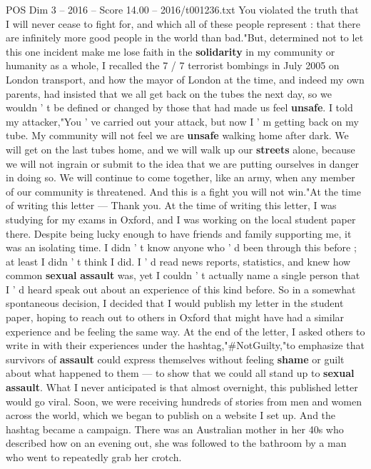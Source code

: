 \begin{textsample}{POS Dim 3 – 2016 – Score 14.00 – 2016/t001236.txt}
You violated the truth that I will never cease to fight for, and which all of these people represent : that there are infinitely more good people in the world than bad."But, determined not to let this one incident make me lose faith in the \textbf{solidarity} in my community or humanity as a whole, I recalled the 7 / 7 terrorist bombings in July 2005 on London transport, and how the mayor of London at the time, and indeed my own parents, had insisted that we all get back on the tubes the next day, so we wouldn ' t be defined or changed by those that had made us feel \textbf{unsafe}.
I told my attacker,"You ' ve carried out your attack, but now I ' m getting back on my tube.
My community will not feel we are \textbf{unsafe} walking home after dark.
We will get on the last tubes home, and we will walk up our \textbf{streets} alone, because we will not ingrain or submit to the idea that we are putting ourselves in danger in doing so.
We will continue to come together, like an army, when any member of our community is threatened.
And this is a fight you will not win."At the time of writing this letter — Thank you.
At the time of writing this letter, I was studying for my exams in Oxford, and I was working on the local student paper there.
Despite being lucky enough to have friends and family supporting me, it was an isolating time.
I didn ' t know anyone who ' d been through this before ; at least I didn ' t think I did.
I ' d read news reports, statistics, and knew how common \textbf{sexual} \textbf{assault} was, yet I couldn ' t actually name a single person that I ' d heard speak out about an experience of this kind before.
So in a somewhat spontaneous decision, I decided that I would publish my letter in the student paper, hoping to reach out to others in Oxford that might have had a similar experience and be feeling the same way.
At the end of the letter, I asked others to write in with their experiences under the hashtag,"\#NotGuilty,"to emphasize that survivors of \textbf{assault} could express themselves without feeling \textbf{shame} or guilt about what happened to them — to show that we could all stand up to \textbf{sexual} \textbf{assault}.
What I never anticipated is that almost overnight, this published letter would go viral.
Soon, we were receiving hundreds of stories from men and women across the world, which we began to publish on a website I set up.
And the hashtag became a campaign.
There was an Australian mother in her 40s who described how on an evening out, she was followed to the bathroom by a man who went to repeatedly grab her crotch.

\end{textsample}
